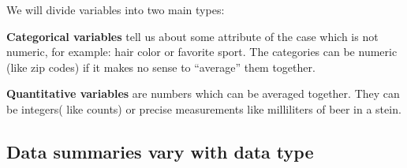 We will divide variables into two main types:
\begin{list}{}{}
\item [\bf Categorical variables] tell us about some attribute of the
  case which is not numeric, for example: hair color or favorite
  sport.  The categories can be numeric (like zip codes) if it makes
  no sense to ``average'' them together.


\item [\bf Quantitative variables] are numbers which can be averaged
  together. They can be integers( like counts) or precise measurements like
  milliliters of beer in a stein.\vspace{1.5in} 
\end{list}


\subsection{  Data summaries vary with data type}


